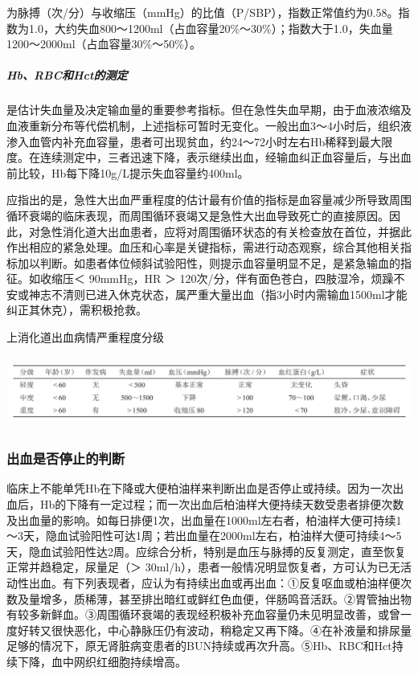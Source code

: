 为脉搏（次/分）与收缩压（mmHg）的比值（P/SBP），指数正常值约为0.58。指数为1.0，大约失血800～1200ml（占血容量20\%～30\%）；指数大于1.0，失血量1200～2000ml（占血容量30\%～50\%）。

\subparagraph{Hb、RBC和Hct的测定}

是估计失血量及决定输血量的重要参考指标。但在急性失血早期，由于血液浓缩及血液重新分布等代偿机制，上述指标可暂时无变化。一般出血3～4小时后，组织液渗入血管内补充血容量，患者可出现贫血，约24～72小时左右Hb稀释到最大限度。在连续测定中，三者迅速下降，表示继续出血，经输血纠正血容量后，与出血前比较，Hb每下降10g/L提示失血容量约400ml。

应指出的是，急性大出血严重程度的估计最有价值的指标是血容量减少所导致周围循环衰竭的临床表现，而周围循环衰竭又是急性大出血导致死亡的直接原因。因此，对急性消化道大出血患者，应将对周围循环状态的有关检查放在首位，并据此作出相应的紧急处理。血压和心率是关键指标，需进行动态观察，综合其他相关指标加以判断。如患者体位倾斜试验阳性，则提示血容量明显不足，是紧急输血的指征。如收缩压＜
90mmHg，HR ＞
120次/分，伴有面色苍白，四肢湿冷，烦躁不安或神志不清则已进入休克状态，属严重大量出血（指3小时内需输血1500ml才能纠正其休克），需积极抢救。

\begin{table}[htbp]
\centering
\caption{上消化道出血病情严重程度分级}
\label{tab13-2}
\includegraphics[width=6.65625in,height=0.91667in]{./images/Image00054.jpg}
\end{table}

\subsubsection{出血是否停止的判断}

临床上不能单凭Hb在下降或大便柏油样来判断出血是否停止或持续。因为一次出血后，Hb的下降有一定过程；而一次出血后柏油样大便持续天数受患者排便次数及出血量的影响。如每日排便1次，出血量在1000ml左右者，柏油样大便可持续1～3天，隐血试验阳性可达1周；若出血量在2000ml左右，柏油样大便可持续4～5天，隐血试验阳性达2周。应综合分析，特别是血压与脉搏的反复测定，直至恢复正常并趋稳定，尿量足（＞
30ml/h），患者一般情况明显恢复者，方可认为已无活动性出血。有下列表现者，应认为有持续出血或再出血：①反复呕血或柏油样便次数及量增多，质稀薄，甚至排出暗红或鲜红色血便，伴肠鸣音活跃。②胃管抽出物有较多新鲜血。③周围循环衰竭的表现经积极补充血容量仍未见明显改善，或曾一度好转又很快恶化，中心静脉压仍有波动，稍稳定又再下降。④在补液量和排尿量足够的情况下，原无肾脏病变患者的BUN持续或再次升高。⑤Hb、RBC和Hct持续下降，血中网织红细胞持续增高。

